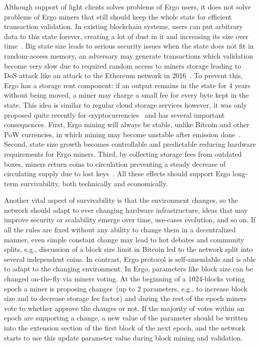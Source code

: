 Although support of light clients solves problems of Ergo users, it does not solve problems
of Ergo miners that still should keep the whole state for efficient
transaction validation.
In existing blockchain systems, users can put arbitrary data to this state forever,
creating a lot of dust in it and increasing its size over time~\cite{perez2019another}.
Big state size leads to serious security issues when the state does not fit in random-access memory,
an adversary may generate transactions which validation become very slow due to required random
access to miners storage
leading to DoS attack like an attack to the Ethereum network in 2016~\cite{??}.
To prevent this, Ergo has a storage rent component: if an
output remains in the state for 4 years without being moved, a miner may charge a small fee for every
byte kept in the state.
This idea is similar to regular cloud storage services however, it was only proposed quite recently for
cryptocurrencies~\cite{chepurnoy2017space} and has several important consequences.
First, Ergo mining will always be stable, unlike Bitcoin and other PoW currencies,
in which mining may become unstable after emission done~\cite{carlsten2016instability}.
Second, state size growth becomes controllable and predictable reducing hardware requirements for Ergo miners.
Third, by collecting storage fees from outdated boxes, miners return coins to circulation preventing a steady decrease
of circulating supply due to lost keys~\cite{wsj2018}.
All these effects should support Ergo long-term survivability, both technically and economically.

Another vital aspect of survivability is that the environment changes, so the network should
adapt to ever changing hardware infrastructure, ideas that may improve security or
scalability emerge over time, use-cases evolution, and so on.
If all the rules are fixed without any ability to change them in a decentralized manner, even
simple constant change may lead to hot debates and community splits, e.g., discussion of a block
size limit in Bitcoin led to the network split into several independent coins.
In contrast, Ergo protocol is self-amendable and is able to adapt to the changing environment.
In Ergo, parameters like block size can be changed on-the-fly via miners voting.
At the beginning of a 1024-blocks voting epoch a miner is proposing changes~(up to 2 parameters,
e.g., to increase block size and to decrease storage fee factor) and during the rest of the epoch miners
vote to whether approve the changes or not.
If the majority of votes within an epoch are supporting a change, a new value of
the parameter should be written into the extension section of the first block of the next epoch, and
the network starts to use this update parameter value during block mining and validation.

